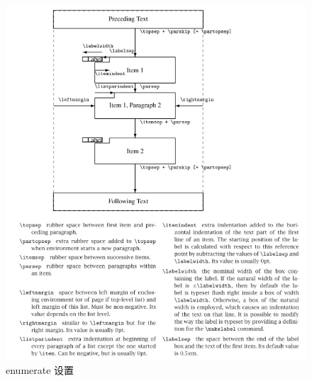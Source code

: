 \documentclass[UTF8,no-math]{ctexart}
\numberwithin{enumi}{section}
\begin{document}
    \begin{figure}[htbp]
        \centering
        \includegraphics[width=\linewidth]{fig/1.jpg}
        \caption{enumerate 设置}
        \label{fig:1}
    \end{figure}
\end{document}
